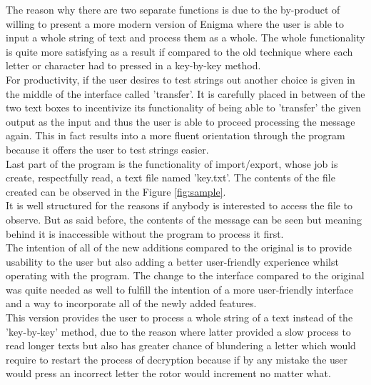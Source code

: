 \documentclass[conference,compsoc]{IEEEtran}
\begin{document}
The reason why there are two separate functions is due to the by-product of willing to present a more modern version of Enigma where the user is able to input a whole string of text and process them as a whole. The whole functionality is quite more satisfying as a result if compared to the old technique where each letter or character had to pressed in a key-by-key method.\\

For productivity, if the user desires to test strings out another choice is given in the middle of the interface called 'transfer'. It is carefully placed in between of the two text boxes to incentivize its functionality of being able to 'transfer' the given output as the input and thus the user is able to proceed processing the message again. This in fact results into a more fluent orientation through the program because it offers the user to test strings easier.  \\


Last part of the program is the functionality of import/export, whose job is create, respectfully read, a text file named 'key.txt'. The contents of the file created can be observed in the Figure \ref{fig:sample}.\\
It is well structured for the reasons if anybody is interested to access the file to observe. But as said before, the contents of the message can be seen but meaning behind it is inaccessible without the program to process it first.\\

The intention of all of the new additions compared to the original is to provide usability to the user but also adding a better user-friendly experience whilst operating with the program. The change to the interface compared to the original was quite needed as well to fulfill the intention of a more user-friendly interface and a way to incorporate all of the newly added features.\\
This version provides the user to process a whole string of a text instead of the 'key-by-key' method, due to the reason where latter provided a slow process to read longer texts but also has greater chance of blundering a letter which would require to restart the process of decryption because if by any mistake the user would press an incorrect letter the rotor would increment no matter what.\\
\end{document}
